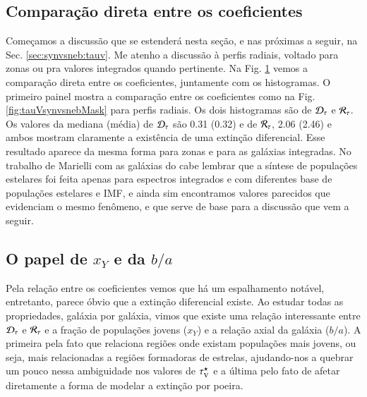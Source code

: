 \subsection{Comparação direta entre os coeficientes}
\label{sec:difextin:emp:comparetauV}

Começamos a discussão que se estenderá nesta seção, e nas próximas a seguir, na Sec.
\ref{sec:synvsneb:tauv}. Me atenho a discussão à perfis radiais, voltado para zonas ou pra valores
integrados quando pertinente. Na Fig. \ref{fig:tauVhisto} vemos a comparação direta entre os
coeficientes, juntamente com os histogramas. O primeiro painel mostra a comparação entre os
coeficientes como na Fig. \ref{fig:tauVsynvsnebMask} para perfis radiais. Os dois histogramas são
de $\Dtau$ e $\Rtau$. Os valores da mediana (média) de $\Dtau$ são 0.31 (0.32) e de $\Rtau$, 2.06
(2.46) e ambos mostram claramente a existência de uma extinção diferencial. Esse resultado aparece
da mesma forma para zonas e para as galáxias integradas. No trabalho de Marielli com as galáxias
do \SDSS cabe lembrar que a síntese de populações estelares foi feita apenas para espectros
integrados e com diferentes base de populações estelares e IMF, e ainda sim encontramos valores
parecidos que evidenciam o mesmo fenômeno, e que serve de base para a discussão que vem a seguir.

\begin{figure}
	\centering
	\caption[Comparação $\tauVS$ e histogramas de $\Dtau$ e $\Rtau$.]
	{}
	\label{fig:tauVhisto}
\end{figure}

\subsection{O papel de $x_Y$ e da $b/a$}
\label{sec:difextin:emp:xYcosi}

Pela relação entre os coeficientes vemos que há um espalhamento notável, entretanto, parece óbvio
que a extinção diferencial existe. Ao estudar todas as propriedades, galáxia por galáxia, vimos que
existe uma relação interessante entre $\Dtau$ e $\Rtau$ e a fração de populações jovens ($x_Y$) e a
relação axial da galáxia ($b/a$). A primeira pela fato que relaciona regiões onde existam populações
mais jovens, ou seja, mais relacionadas a regiões formadoras de estrelas, ajudando-nos a quebrar um
pouco nessa ambiguidade nos valores de $\tauVS$ e a última pelo fato de afetar diretamente a forma
de modelar a extinção por poeira.

